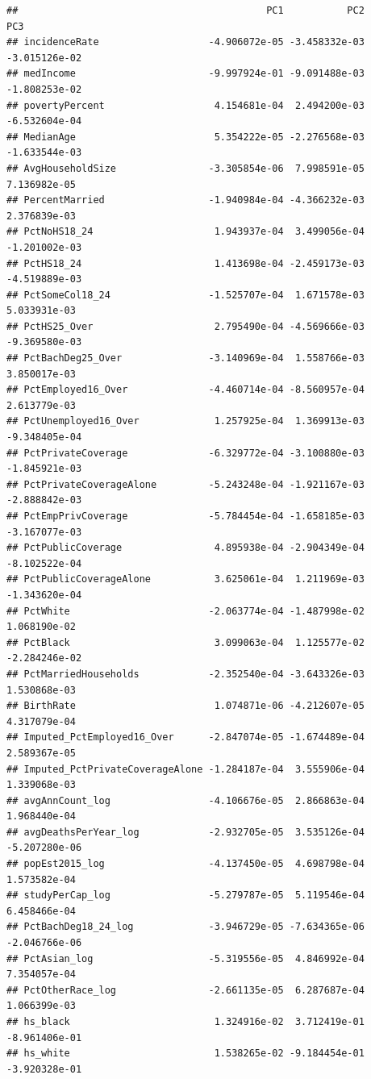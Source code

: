 \documentclass[
  11pt,
]{article}
\begin{document}
\begin{verbatim}
##                                           PC1           PC2           PC3
## incidenceRate                   -4.906072e-05 -3.458332e-03 -3.015126e-02
## medIncome                       -9.997924e-01 -9.091488e-03 -1.808253e-02
## povertyPercent                   4.154681e-04  2.494200e-03 -6.532604e-04
## MedianAge                        5.354222e-05 -2.276568e-03 -1.633544e-03
## AvgHouseholdSize                -3.305854e-06  7.998591e-05  7.136982e-05
## PercentMarried                  -1.940984e-04 -4.366232e-03  2.376839e-03
## PctNoHS18_24                     1.943937e-04  3.499056e-04 -1.201002e-03
## PctHS18_24                       1.413698e-04 -2.459173e-03 -4.519889e-03
## PctSomeCol18_24                 -1.525707e-04  1.671578e-03  5.033931e-03
## PctHS25_Over                     2.795490e-04 -4.569666e-03 -9.369580e-03
## PctBachDeg25_Over               -3.140969e-04  1.558766e-03  3.850017e-03
## PctEmployed16_Over              -4.460714e-04 -8.560957e-04  2.613779e-03
## PctUnemployed16_Over             1.257925e-04  1.369913e-03 -9.348405e-04
## PctPrivateCoverage              -6.329772e-04 -3.100880e-03 -1.845921e-03
## PctPrivateCoverageAlone         -5.243248e-04 -1.921167e-03 -2.888842e-03
## PctEmpPrivCoverage              -5.784454e-04 -1.658185e-03 -3.167077e-03
## PctPublicCoverage                4.895938e-04 -2.904349e-04 -8.102522e-04
## PctPublicCoverageAlone           3.625061e-04  1.211969e-03 -1.343620e-04
## PctWhite                        -2.063774e-04 -1.487998e-02  1.068190e-02
## PctBlack                         3.099063e-04  1.125577e-02 -2.284246e-02
## PctMarriedHouseholds            -2.352540e-04 -3.643326e-03  1.530868e-03
## BirthRate                        1.074871e-06 -4.212607e-05  4.317079e-04
## Imputed_PctEmployed16_Over      -2.847074e-05 -1.674489e-04  2.589367e-05
## Imputed_PctPrivateCoverageAlone -1.284187e-04  3.555906e-04  1.339068e-03
## avgAnnCount_log                 -4.106676e-05  2.866863e-04  1.968440e-04
## avgDeathsPerYear_log            -2.932705e-05  3.535126e-04 -5.207280e-06
## popEst2015_log                  -4.137450e-05  4.698798e-04  1.573582e-04
## studyPerCap_log                 -5.279787e-05  5.119546e-04  6.458466e-04
## PctBachDeg18_24_log             -3.946729e-05 -7.634365e-06 -2.046766e-06
## PctAsian_log                    -5.319556e-05  4.846992e-04  7.354057e-04
## PctOtherRace_log                -2.661135e-05  6.287687e-04  1.066399e-03
## hs_black                         1.324916e-02  3.712419e-01 -8.961406e-01
## hs_white                         1.538265e-02 -9.184454e-01 -3.920328e-01

\end{verbatim}
\end{document}

